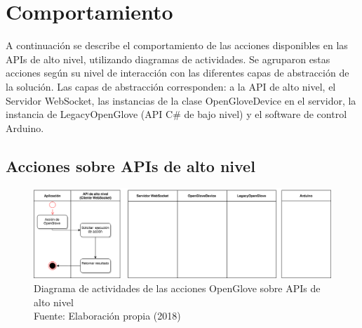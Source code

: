 \section{Comportamiento}
\label{seccion-comportamiento-apis}
A continuación se describe el comportamiento de las acciones disponibles en las APIs de alto nivel, utilizando diagramas de actividades. Se agruparon estas acciones según su nivel de interacción con las diferentes capas de abstracción de la solución. Las capas de abstracción corresponden: a la API de alto nivel, el Servidor WebSocket, las instancias de la clase OpenGloveDevice en el servidor, la instancia de LegacyOpenGlove (API C\# de bajo nivel) y el software de control Arduino. 

\subsection{Acciones sobre APIs de alto nivel} 
\begin{figure}[H]
  \begin{center} 
   	\includegraphics[width=1.0\textwidth]{images/chapter04/ActivityDiagrams-OpenGloveActions-0.png} 
   	\captionsetup{justification=centering}
    \caption[Diagrama de actividades de las acciones OpenGlove sobre APIs de alto nivel]{Diagrama de actividades de las acciones OpenGlove sobre APIs de alto nivel \\Fuente: Elaboración propia (2018)}
    \label{fig:activity-diagrams-0-api-hl}
  \end{center}
\end{figure}


